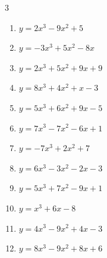 \begin{multicols}{3}
\begin{enumerate}
  \item $y=2x^{3}-9x^{2}+5$


  \item $y=-3x^{3}+5x^{2}-8x$


  \item $y=2x^{3}+5x^{2}+9x+9$


  \item $y=8x^{3}+4x^{2}+x-3$


  \item $y=5x^{3}+6x^{2}+9x-5$


  \item $y=7x^{3}-7x^{2}-6x+1$


  \item $y=-7x^{3}+2x^{2}+7$


  \item $y=6x^{3}-3x^{2}-2x-3$


\columnbreak %

\resetques

  \item $y=5x^{3}+7x^{2}-9x+1$


  \item $y=x^{3}+6x-8$


  \item $y=4x^{3}-9x^{2}+4x-3$


  \item $y=8x^{3}-9x^{2}+8x+6$



\end{enumerate}
\end{multicols}
